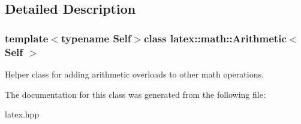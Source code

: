 \subsection{Detailed Description}
\subsubsection*{template$<$typename Self$>$class latex\-::math\-::\-Arithmetic$<$ Self $>$}

Helper class for adding arithmetic overloads to other math operations. 

The documentation for this class was generated from the following file\-:\begin{DoxyCompactItemize}
\item 
latex.\-hpp\end{DoxyCompactItemize}
